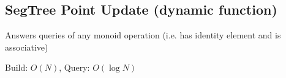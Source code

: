 \subsection{SegTree Point Update (dynamic function)}
Answers queries of any monoid operation (i.e. has identity element and is associative)

Build: $O(N)$, Query: $O(\log N)$
